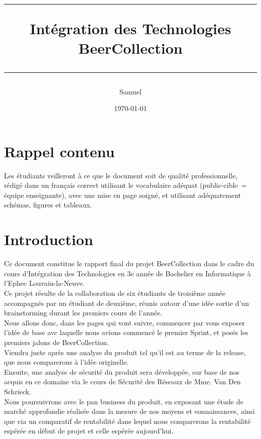 \documentclass{report}
\title{
\parbox{15cm}
{ \vspace{3cm}
	\begin{center}\sf\bfseries\Huge
		\rule{15cm}{1pt}
		\medskip
		Intégration des Technologies\\
		\huge BeerCollection
		\vspace{.5cm}
		\rule{15cm}{1pt}
	\end{center}
	\vspace{3cm}
 }}
\author{Samuel \bsc{Monroe}}
\date{\today}
\begin{document}
\maketitle

\newpage
\thispagestyle{empty}
\mbox{}

\tableofcontents

\chapter{Rappel contenu}

Les étudiants veilleront à ce que le document soit de qualité professionnelle, rédigé dans un français correct utilisant le vocabulaire adéquat (public-cible = équipe enseignante), avec une mise en page soigné, et utilisant adéquatement schémas, figures et tableaux.  


\chapter{Introduction} %

	 Ce document constitue le rapport final du projet BeerCollection dans le cadre du cours d'Intégration des Technologies en 3e année de Bachelier en Informatique à l'Ephec Louvain-la-Neuve.\\
	 Ce projet résulte de la collaboration de six étudiants de troisième année accompagnés par un étudiant de deuxième, réunis autour d'une idée sortie d'un brainstorming durant les premiers cours de l'année.\\

	 Nous allons donc, dans les pages qui vont suivre, commencer par vous exposer l'idée de base avc laquelle nous avions commencé le premier Sprint, et posés les premiers jalons de BeerCollection.\\
	 Viendra juste après une analyse du produit tel qu'il est au terme de la release, que nous comparerons à l'idée originelle.\\

	 Ensuite, une analyse de sécurité du produit sera développée, sur base de nos acquis en ce domaine via le cours de Sécurité des Réseaux de Mme. Van Den Schrieck.\\

	 Nous poursuivrons avec le pan business du produit, en exposant une étude de marché approfondie réalisée dans la mesure de nos moyens et connaissances, ainsi que via un comparatif de rentabilité dans lequel nous comparerons la rentabilité espérée en début de projet et celle espérée aujourd'hui.\\
\end{document}
